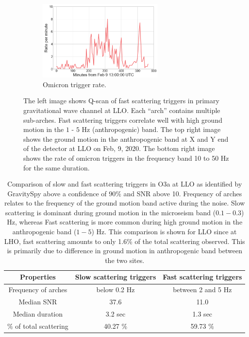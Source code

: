 \documentclass[12pt]{iopart}
\begin{document}
\begin{figure}
\begin{minipage}{0.45\textwidth}
    \vspace*{0.6cm}
    \begin{subfigure}{\textwidth}
    \includegraphics[width=\textwidth,height=4cm]{fast_glitchrate1.png}
    \caption{Omicron trigger rate.} \label{subfig:fast_scat_rate}
    \end{subfigure}
    \end{minipage}
    \caption{The left image shows Q-scan of fast scattering triggers in primary gravitational wave channel at LLO. Each ``arch'' contains multiple sub-arches. Fast scattering triggers correlate well with high ground motion in the $1$ - $5$ Hz (anthropogenic) band. The top right image shows the ground motion in the anthropogenic band at X and Y end of the detector at LLO on Feb, 9, 2020. The bottom right image shows the rate of omicron triggers in the frequency band 10 to 50 Hz for the same duration. }
    \label{fig:Fast_scattering}

\end{figure}

\begin{table}[h]
    \centering
    \begin{tabular}{c|c|c}
    \hline
      \textbf{Properties}   &  \textbf{Slow scattering triggers} & 
      \textbf{Fast scattering triggers}\\
      \hline
       Frequency of arches  & below 0.2 Hz & between 2 and 5 Hz \\
      \hline
      Median SNR & 37.6 & 11.0 \\
      \hline
      Median duration & 3.2 sec & 1.3 sec \\
      \hline
      \% of total scattering & 40.27 \% & 59.73 \% \\
       
    \hline
    \end{tabular}
    \caption{Comparison of slow and fast scattering triggers in O3a at LLO as identified by GravitySpy above a confidence of $90 \%$ and SNR above 10. Frequency of arches relates to the frequency of the ground motion band active during the noise. Slow scattering is dominant during ground motion in the microseism band ($0.1-0.3$) Hz, whereas Fast scattering is more common during high ground motion in the anthropogenic band ($1-5$) Hz. This comparison is shown for LLO since at LHO, fast scattering amounts to only 1.6\% of the total scattering observed. This is primarily due to difference in ground motion in anthropogenic band between the two sites. }
    \label{tab:fastslowtab}
\end{table}{}
\end{document}
